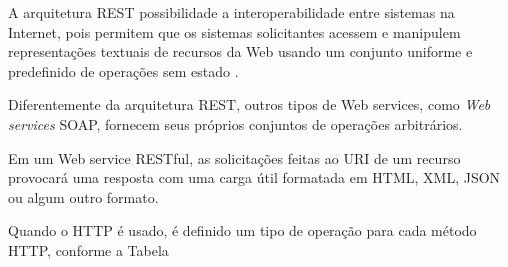 \documentclass[
	12pt,				%
	oneside,			%
	a4paper,			%
	english,			%
	brazil				%
]{abntex2}
\begin{document}
	
	A arquitetura REST possibilidade a interoperabilidade entre sistemas na Internet, pois permitem que os sistemas solicitantes acessem e manipulem representações textuais de recursos da Web usando um conjunto uniforme e predefinido de operações sem estado \cite{ferris2004webservices}.
	
	Diferentemente da arquitetura REST, outros tipos de Web services, como \textit{Web services} SOAP, fornecem seus próprios conjuntos de operações arbitrários.

	Em um Web service RESTful, as solicitações feitas ao URI de um recurso provocará uma resposta com uma carga útil formatada em HTML, XML, JSON ou algum outro formato.
	
	Quando o HTTP é usado, é definido um tipo de operação para cada método HTTP, conforme a Tabela
	
\end{document}
